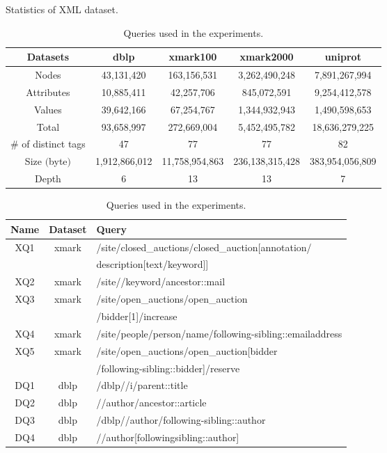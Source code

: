 \begin{table}
	\centering
	\small
	\caption{Statistics of XML dataset.}
	\label{tab:datasets}
	\begin{tabular}{c|c|c|c|c}
		\hline
		Datasets & dblp & xmark100 & xmark2000 & uniprot \\
		\hline \hline
		Nodes & 43,131,420 & 163,156,531 & 3,262,490,248 & 7,891,267,994 \\
		\hline
		Attributes & 10,885,411 & 42,257,706 & 845,072,591 & 9,254,412,578 \\
		\hline
		Values & 39,642,166 & 67,254,767 & 1,344,932,943 & 1,490,598,653 \\
		\hline
		Total & 93,658,997 & 272,669,004 & 5,452,495,782 & 18,636,279,225 \\
		\hline
		\# of distinct tags & 47 & 77 & 77 & 82 \\
		\hline
		Size $($byte$)$ & 1,912,866,012 & 11,758,954,863 & 236,138,315,428 & 383,954,056,809 \\
		\hline
		Depth & 6 & 13 & 13 & 7 \\
		\hline
	\end{tabular}
	\vspace{10px}
	\caption{Queries used in the experiments.}
	\label{tab:exp1_queries}
	\begin{tabular}{c|c|l}
		\hline \hline
		Name & Dataset & Query  \\
		\hline
		XQ1 & xmark & /site/closed\_auctions/closed\_auction[annotation/ \\
		&&description[text/keyword]]\\
		\hline
		XQ2 & xmark & /site//keyword/ancestor::mail \\
		\hline
		XQ3 & xmark & /site/open\_auctions/open\_auction  \\
		&&/bidder[1]/increase\\
		\hline
		XQ4 & xmark & /site/people/person/name/following-sibling::emailaddress \\
		\hline
		XQ5 & xmark & /site/open\_auctions/open\_auction[bidder\\
		&&/following-sibling::bidder]/reserve\\
		\hline
		DQ1 & dblp & /dblp//i/parent::title\\
		\hline
		DQ2 & dblp & //author/ancestor::article \\
		\hline
		DQ3 & dblp & /dblp//author/following-sibling::author \\
		\hline
		DQ4 & dblp & //author[following\textemdash sibling::author] \\

\end{tabular}
\end{table}

